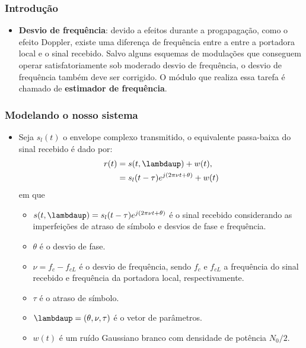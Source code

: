 \begin{frame}[t]
	\frametitle{Introdução}
    \begin{itemize}
        \item \textbf{Desvio de frequência}: devido a efeitos durante a progapagação, como o efeito Doppler, existe uma diferença de frequência entre a entre a portadora local e o sinal recebido. Salvo alguns esquemas de modulações que conseguem operar satisfatoriamente sob moderado desvio de frequência, o desvio de frequência também deve ser corrigido. O módulo que realiza essa tarefa é chamado de \textbf{estimador de frequência}.
    \end{itemize}
\end{frame}

\begin{frame}[t]
	\frametitle{Modelando o nosso sistema}
	\begin{itemize}		
	
		\item Seja \(s_l (t)\) o envelope complexo transmitido, o equivalente passa-baixa do sinal recebido é dado por:
		\begin{align}
            r(t) & = s(t, \boldsymbol{\lambdaup}) + w(t), \nonumber \\
                 & = s_l (t-\tau) e^{j(2\pi \nu t + \theta)} + w(t)
            \label{eq:r_t}
        \end{align}
        em que
        \begin{itemize}
            \item \(s(t, \boldsymbol{\lambdaup}) = s_l (t-\tau) e^{j(2\pi \nu t + \theta)}\) é o sinal recebido considerando as imperfeições de atraso de símbolo e desvios de fase e frequência.
            \item \(\theta\) é o desvio de fase.
            \item \(\nu = f_c - f_{cL}\) é o desvio de frequência, sendo \(f_c\) e \(f_{cL}\) a frequência do sinal recebido e frequência da portadora local, respectivamente.
            \item \(\tau\) é o atraso de símbolo.
            \item \(\boldsymbol{\lambdaup} = (\theta, \nu, \tau)\) é o vetor de parâmetros.
            \item \(w(t)\) é um ruído Gaussiano branco com densidade de potência \(N_0/2\).
        \end{itemize}
	\end{itemize}
	
\end{frame}

